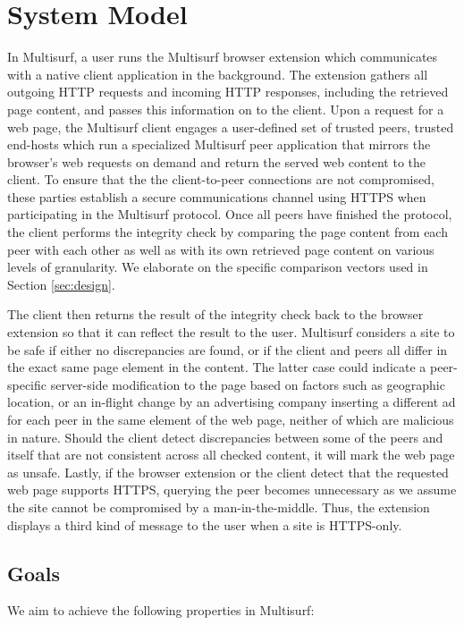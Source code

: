 \section{System Model}
\label{sec:model}

In Multisurf, a user runs the Multisurf browser extension which communicates with a native client application in the background.
The extension gathers all outgoing HTTP requests and incoming HTTP responses, including the retrieved page content, and passes this information on to the client.
Upon a request for a web page, the Multisurf client engages a user-defined set of trusted peers, trusted end-hosts which run a specialized Multisurf peer application that mirrors the browser's web requests on demand and return the served web content to the client.
To ensure that the the client-to-peer connections are not compromised, these parties establish a secure communications channel using HTTPS when participating in the Multisurf protocol.
Once all peers have finished the protocol, the client performs the integrity check by comparing the page content from each peer with each other as well as with its own retrieved page content on various levels of granularity.
We elaborate on the specific comparison vectors used in Section \ref{sec:design}.

The client then returns the result of the integrity check back to the browser extension so that it can reflect the result to the user.
Multisurf considers a site to be safe if either no discrepancies are found, or if the client and peers all differ in the exact same page element in the content. 
The latter case could indicate a peer-specific server-side modification to the page based on factors such as geographic location, or an in-flight change by an advertising company inserting a different ad for each peer in the same element of the web page, neither of which are malicious in nature. 
Should the client detect discrepancies between some of the peers and itself that are not consistent across all checked content, it will mark the web page as unsafe.
Lastly, if the browser extension or the client detect that the requested web page supports HTTPS, querying the peer becomes unnecessary as we assume the site cannot be compromised by a man-in-the-middle.
Thus, the extension displays a third kind of message to the user when a site is HTTPS-only.

\subsection{Goals}
\label{sec:sec:goals}
We aim to achieve the following properties in Multisurf:


